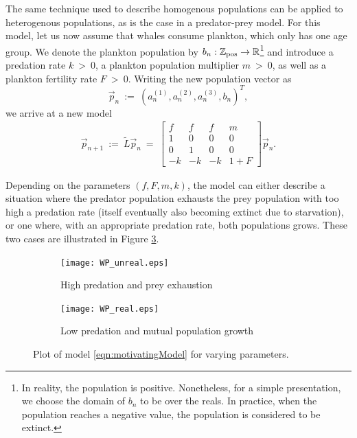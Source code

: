 \documentclass[11pt,reqno]{amsart}
\numberwithin{equation}{section}
\theoremstyle{plain}
\begin{document}
The same technique used to describe homogenous populations can be applied to heterogenous populations, as is the case in a predator-prey model. For this model, let us now assume that whales consume plankton, which only has one age group. 
We denote the plankton population by $b_n:\mathbb Z_{\rm pos} \rightarrow \mathbb R$\footnote{
In reality, the population is positive. Nonetheless, for a simple presentation, we choose the domain of $b_n$ to be over the reals. In practice, when the population reaches a negative value, the population is considered to be extinct. 
} and introduce a predation rate $k \ > \  0$, a plankton population multiplier $m\ > \  0$, as well as a plankton fertility rate $F \ > \  0$. Writing the 
new population vector as
\begin{equation}
    \vec p_n \ := \ (a^{(1)}_n, a^{(2)}_n, a^{(3)}_n, b_n)^T,
\end{equation}
we arrive at a new model
\begin{eqnarray}\label{eqn:motivatingModel}
    \vec p_{n + 1} \ :=\ \widetilde L\vec p_n \ = \ 
    \begin{bmatrix}
        f & f & f & m\\ 
        1 & 0 & 0 & 0\\
        0 & 1 & 0 & 0 \\ 
        -k & -k & -k & 1 + F
    \end{bmatrix}\vec p_n.
\end{eqnarray}

Depending on the parameters $(f, F, m, k)$, the model can either describe a situation where the predator population exhausts the prey population with too high a predation rate (itself eventually also becoming extinct due to starvation), or one where, with an appropriate predation rate, both populations grows. These two cases are illustrated in Figure \ref{fig:Mot12}.




\begin{figure}[htp]
    \centering
    \begin{subfigure}[b]{0.45\textwidth}
        \texttt{[image: WP\_unreal.eps]}
        \caption{High predation and prey exhaustion}
        \label{fig:Mot2}
    \end{subfigure}
    \hfill
    \begin{subfigure}[b]{0.45\textwidth}
        \texttt{[image: WP\_real.eps]}
        \caption{Low predation and mutual population growth}
        \label{fig:Mot1}
    \end{subfigure}
    \caption{Plot of model \ref{eqn:motivatingModel} for varying parameters.}
    \label{fig:Mot12}
\end{figure}
\end{document}
